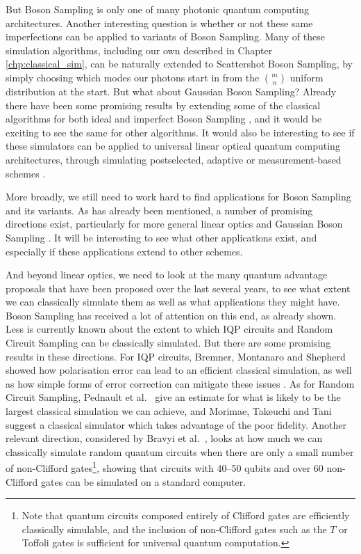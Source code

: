 But Boson Sampling is only one of many photonic quantum computing architectures. Another interesting question is whether or not these same imperfections can be applied to variants of Boson Sampling. Many of these simulation algorithms, including our own described in Chapter \ref{chp:classical_sim}, can be naturally extended to Scattershot Boson Sampling, by simply choosing which modes our photons start in from the $\binom{m}{n}$ uniform distribution at the start. But what about Gaussian Boson Sampling? Already there have been some promising results by extending some of the classical algorithms for both ideal and imperfect Boson Sampling \cite{qi2019, quesada2019, wu2019, renema2019}, and it would be exciting to see the same for other algorithms. It would also be interesting to see if these simulators can be applied to universal linear optical quantum computing architectures, through simulating postselected, adaptive or measurement-based schemes \cite{knill2001, gimenosegovia2015}.

More broadly, we still need to work hard to find applications for Boson Sampling and its variants. As has already been mentioned, a number of promising directions exist, particularly for more general linear optics \cite{sparrow2018} and Gaussian Boson Sampling \cite{huh2015, bradler2018, schuld2019}. It will be interesting to see what other applications exist, and especially if these applications extend to other schemes.

And beyond linear optics, we need to look at the many quantum advantage proposals that have been proposed over the last several years, to see what extent we can classically simulate them as well as what applications they might have. Boson Sampling has received a lot of attention on this end, as already shown. Less is currently known about the extent to which IQP circuits and Random Circuit Sampling can be classically simulated. But there are some promising results in these directions. For IQP circuits, Bremner, Montanaro and Shepherd showed how polarisation error can lead to an efficient classical simulation, as well as how simple forms of error correction can mitigate these issues \cite{bremner2017}. As for Random Circuit Sampling, Pednault et al.~\cite{pednault2019} give an estimate for what is likely to be the largest classical simulation we can achieve, and Morimae, Takeuchi and Tani \cite{morimae2019google} suggest a classical simulator which takes advantage of the poor fidelity. Another relevant direction, considered by Bravyi et al.~\cite{bravyi2019}, looks at how much we can classically simulate random quantum circuits when there are only a small number of non-Clifford gates\footnote{Note that quantum circuits composed entirely of Clifford gates are efficiently classically simulable, and the inclusion of non-Clifford gates such as the $T$ or Toffoli gates is sufficient for universal quantum computation.}, showing that circuits with 40--50 qubits and over 60 non-Clifford gates can be simulated on a standard computer.

